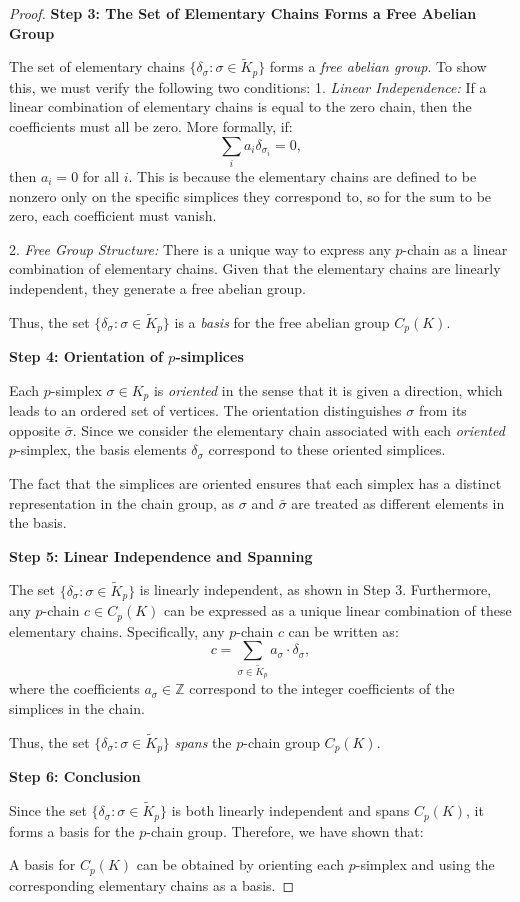\documentclass[12pt,oneside,reqno]{amsart}
\theoremstyle{plain}
\theoremstyle{definition}
\theoremstyle{remark}
\newcommand{\0}{{\textbf{0}}}
\begin{document}
\begin{proof}
\textbf{Step 3: The Set of Elementary Chains Forms a Free Abelian Group}

The set of elementary chains $\{ \delta_\sigma : \sigma \in \widetilde{K}_p \}$ forms a \textit{free abelian group}. To show this, we must verify the following two conditions:
1. \textit{Linear Independence:}  
   If a linear combination of elementary chains is equal to the zero chain, then the coefficients must all be zero. More formally, if:
   \[
   \sum_{i} a_i \delta_{\sigma_i} = 0,
   \]
   then $a_i = 0$ for all $i$. This is because the elementary chains are defined to be nonzero only on the specific simplices they correspond to, so for the sum to be zero, each coefficient must vanish.
   
2. \textit{Free Group Structure:}  
   There is a unique way to express any $p$-chain as a linear combination of elementary chains. Given that the elementary chains are linearly independent, they generate a free abelian group.

Thus, the set $\{ \delta_\sigma : \sigma \in \widetilde{K}_p \}$ is a \textit{basis} for the free abelian group $C_p(K)$.

\textbf{Step 4: Orientation of $p$-simplices}

Each $p$-simplex $\sigma \in K_p$ is \textit{oriented} in the sense that it is given a direction, which leads to an ordered set of vertices. The orientation distinguishes $\sigma$ from its opposite $\bar{\sigma}$. Since we consider the elementary chain associated with each \textit{oriented} $p$-simplex, the basis elements $\delta_\sigma$ correspond to these oriented simplices.

The fact that the simplices are oriented ensures that each simplex has a distinct representation in the chain group, as $\sigma$ and $\bar{\sigma}$ are treated as different elements in the basis.

\textbf{Step 5: Linear Independence and Spanning}

The set $\{ \delta_\sigma : \sigma \in \widetilde{K}_p \}$ is linearly independent, as shown in Step 3. Furthermore, any $p$-chain $c \in C_p(K)$ can be expressed as a unique linear combination of these elementary chains. Specifically, any $p$-chain $c$ can be written as:
\[
c = \sum_{\sigma \in \widetilde{K}_p} a_\sigma \cdot \delta_\sigma,
\]
where the coefficients $a_\sigma \in \mathbb{Z}$ correspond to the integer coefficients of the simplices in the chain.

Thus, the set $\{ \delta_\sigma : \sigma \in \widetilde{K}_p \}$ \textit{spans} the $p$-chain group $C_p(K)$.

\textbf{Step 6: Conclusion}

Since the set $\{ \delta_\sigma : \sigma \in \widetilde{K}_p \}$ is both linearly independent and spans $C_p(K)$, it forms a basis for the $p$-chain group. Therefore, we have shown that:

A basis for  $C_p(K)$ can be obtained by orienting each $p$-simplex and using the corresponding elementary chains as a basis.
\end{proof}
\end{document}
